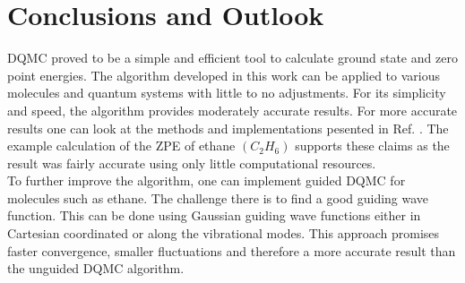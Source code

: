 \documentclass [12pt]{report}
\begin{document}
\chapter{Conclusions and Outlook}
DQMC proved to be a simple and efficient tool to calculate ground state and zero point energies. The algorithm developed in this work can be applied to various molecules and quantum systems with little to no adjustments. For its simplicity and speed, the algorithm provides moderately accurate results. For more accurate results one can look at the methods and implementations pesented in Ref. \cite{c2h6}. The example calculation of the ZPE of ethane $(C_{2}H_{6})$ supports these claims as the result was fairly accurate using only little computational resources.\\
To further improve the algorithm, one can implement guided DQMC for molecules such as ethane. The challenge there is to find a good guiding wave function. This can be done using Gaussian guiding wave functions either in Cartesian coordinated or along the  vibrational modes. This approach promises faster convergence, smaller fluctuations and therefore a more accurate result than the unguided DQMC algorithm.
\end{document}
